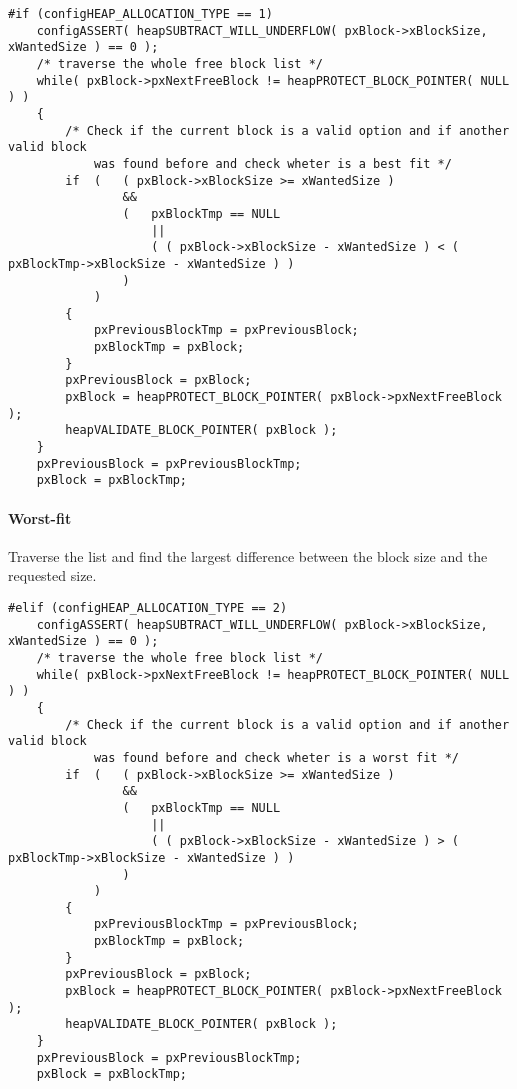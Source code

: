     \begin{codebox}
    \begin{lstlisting}
#if (configHEAP_ALLOCATION_TYPE == 1)
    configASSERT( heapSUBTRACT_WILL_UNDERFLOW( pxBlock->xBlockSize, xWantedSize ) == 0 );
    /* traverse the whole free block list */
    while( pxBlock->pxNextFreeBlock != heapPROTECT_BLOCK_POINTER( NULL ) )
    {
        /* Check if the current block is a valid option and if another valid block
            was found before and check wheter is a best fit */
        if  (   ( pxBlock->xBlockSize >= xWantedSize )
                &&
                (   pxBlockTmp == NULL
                    ||
                    ( ( pxBlock->xBlockSize - xWantedSize ) < ( pxBlockTmp->xBlockSize - xWantedSize ) )
                )
            )
        {
            pxPreviousBlockTmp = pxPreviousBlock;
            pxBlockTmp = pxBlock;
        }
        pxPreviousBlock = pxBlock;
        pxBlock = heapPROTECT_BLOCK_POINTER( pxBlock->pxNextFreeBlock );
        heapVALIDATE_BLOCK_POINTER( pxBlock );
    }
    pxPreviousBlock = pxPreviousBlockTmp;
    pxBlock = pxBlockTmp;
    \end{lstlisting}
    \end{codebox}

    \paragraph{Worst-fit} Traverse the list and find the largest difference between the block size and the requested size.

    \begin{codebox}
    \begin{lstlisting}
#elif (configHEAP_ALLOCATION_TYPE == 2)
    configASSERT( heapSUBTRACT_WILL_UNDERFLOW( pxBlock->xBlockSize, xWantedSize ) == 0 );
    /* traverse the whole free block list */
    while( pxBlock->pxNextFreeBlock != heapPROTECT_BLOCK_POINTER( NULL ) )
    {
        /* Check if the current block is a valid option and if another valid block
            was found before and check wheter is a worst fit */
        if  (   ( pxBlock->xBlockSize >= xWantedSize )
                &&
                (   pxBlockTmp == NULL
                    ||
                    ( ( pxBlock->xBlockSize - xWantedSize ) > ( pxBlockTmp->xBlockSize - xWantedSize ) )
                )
            )
        {
            pxPreviousBlockTmp = pxPreviousBlock;
            pxBlockTmp = pxBlock;
        }
        pxPreviousBlock = pxBlock;
        pxBlock = heapPROTECT_BLOCK_POINTER( pxBlock->pxNextFreeBlock );
        heapVALIDATE_BLOCK_POINTER( pxBlock );
    }
    pxPreviousBlock = pxPreviousBlockTmp;
    pxBlock = pxBlockTmp;
    \end{lstlisting}
    \end{codebox}

